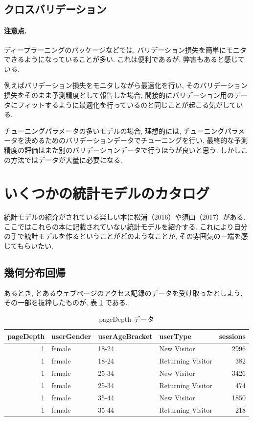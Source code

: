 \documentclass[a4paper, 12pt]{jarticle}
\begin{document}
\subsection{クロスバリデーション}

\paragraph{注意点.}
ディープラーニングのパッケージなどでは, バリデーション損失を簡単にモニタできるようになっていることが多い. これは便利であるが, 弊害もあると感じている.

例えばバリデーション損失をモニタしながら最適化を行い, そのバリデーション損失をそのまま予測精度として報告した場合, 間接的にバリデーション用のデータにフィットするように最適化を行っているのと同じことが起こる気がしている. 

チューニングパラメータの多いモデルの場合, 理想的には, チューニングパラメータを決めるためのバリデーションデータでチューニングを行い, 最終的な予測精度の評価はまた別のバリデーションデータで行うほうが良いと思う. しかしこの方法ではデータが大量に必要になる. 


\section{いくつかの統計モデルのカタログ}
\label{secCata}

統計モデルの紹介がされている楽しい本に松浦（2016）や須山（2017）がある.
ここではこれらの本に記載されていない統計モデルを紹介する. これにより自分の手で統計モデルを作るということがどのようなことか, その雰囲気の一端を感じてもらいたい. 

\subsection{幾何分布回帰}

あるとき, とあるウェブページのアクセス記録のデータを受け取ったとしよう. 
その一部を抜粋したものが, 表 \ref{tabPageDepth} である.

\begin{table}[ht]
\centering
\caption{pageDepth データ}
\label{tabPageDepth}
\begin{tabular}{rlllr}
  \hline
 pageDepth & userGender & userAgeBracket & userType & sessions \\ 
  \hline
 1 & female & 18-24 & New Visitor & 2996 \\ 
 1 & female & 18-24 & Returning Visitor & 382 \\ 
 1 & female & 25-34 & New Visitor & 3426 \\ 
 1 & female & 25-34 & Returning Visitor & 474 \\ 
 1 & female & 35-44 & New Visitor & 1850 \\ 
 1 & female & 35-44 & Returning Visitor & 218 \\ 
   \hline
\end{tabular}
\end{table}
\end{document}
